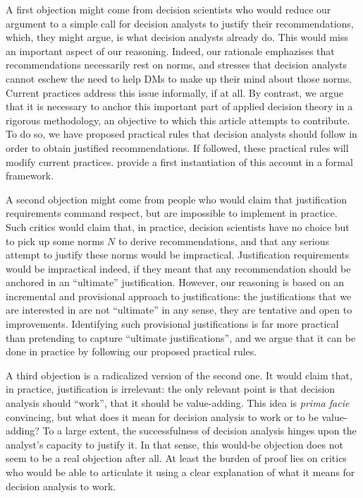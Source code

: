 \documentclass[preprint, french, english, 11pt, authoryear]{elsarticle}%
\begin{document}
A first objection might come from decision scientists who would reduce our argument to a simple call for decision analysts to justify their recommendations, which, they might argue, is what decision analysts already do. This would miss an important aspect of our reasoning. Indeed, our rationale emphazises that recommendations necessarily rest on norms, and stresses that decision analysts cannot eschew the need to help \acp{DM} to make up their mind about those norms. Current practices address this issue informally, if at all. By contrast, we argue that it is necessary to anchor this important part of applied decision theory in a rigorous methodology, an objective to which this article attempts to contribute. To do so, we have proposed practical rules that decision analysts should follow in order to obtain justified recommendations. If followed, these practical rules will modify current practices. \citet{cailloux_formal_2018} provide a first instantiation of this account in a formal framework.

A second objection might come from people who would claim that justification requirements command respect, but are impossible to implement in practice. Such critics would claim that, in practice, decision scientists have no choice but to pick up some norms $N$ to derive recommendations, and that any serious attempt to justify these norms would be impractical. Justification requirements would be impractical indeed, if they meant that any recommendation should be anchored in an “ultimate” justification. However, our reasoning is based on an incremental and provisional approach to justifications: the justifications that we are interested in are not ``ultimate'' in any sense, they are tentative and open to improvements. Identifying such provisional justifications is far more practical than pretending to capture ``ultimate justifications'', and we argue that it can be done in practice by following our proposed practical rules.

A third objection is a radicalized version of the second one. It would claim that, in practice, justification is irrelevant: the only relevant point is that decision analysis should ``work'', that it should be value-adding. This idea is \emph{prima facie} convincing, but what does it mean for decision analysis to work or to be value-adding? 
To a large extent, the successfulness of decision analysis hinges upon the analyst's capacity to justify it. In that sense, this would-be objection does not seem to be a real objection after all. At least the burden of proof lies on critics who would be able to articulate it using a clear explanation of what it means for decision analysis to work. 
\end{document}
